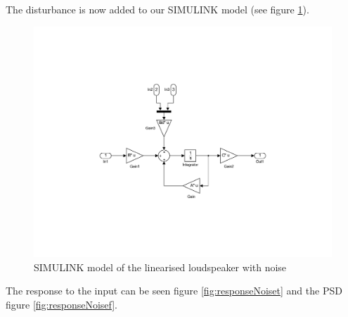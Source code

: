 The disturbance is now added to our SIMULINK model (see figure \ref{fig:linearModelNoise}).

\begin{figure}[H]
 \centering 
 \includegraphics[trim=5cm 5cm 2cm 5cm, clip=true, totalheight=0.35\textheight, angle=0]{figures/linearModelNoise.pdf}
 \caption{SIMULINK model of the linearised loudspeaker with noise}
\label{fig:linearModelNoise}
\end{figure}

The response to the input can be seen figure \ref{fig:responseNoiset} and the PSD figure \ref{fig:responseNoisef}.

